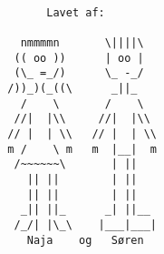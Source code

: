 \documentclass[10pt,a4paper,danish]{article}
\begin{document}
\begin{verbatim}

        Lavet af:

    nmmmmn       \||||\
   (( oo ))      | oo |
   (\_ =_/)      \_ -_/
  /))_)(_((\      _||_
    /    \       /    \
   //|  |\\     //|  |\\
  // |  | \\   // |  | \\
  m /    \ m   m  |__|  m
   /~~~~~~\       | ||  
     || ||        | ||  
     || ||        | ||  
    _|| ||_      _| ||__
   /_/| |\_\    |___|___|
     Naja    og   Søren

\end{verbatim}
\end{document}
